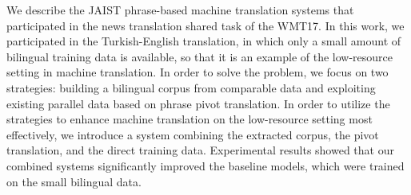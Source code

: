 We describe the JAIST phrase-based machine translation systems that participated in the news translation shared task of the WMT17. In this work, we participated in the Turkish-English translation, in which only a small amount of bilingual training data is available, so that it is an example of the low-resource setting in machine translation. In order to solve the problem, we focus on two strategies: building a bilingual corpus from comparable data and exploiting existing parallel data based on phrase pivot translation. In order to utilize the strategies to enhance machine translation on the low-resource setting most effectively, we introduce a system combining the extracted corpus, the pivot translation, and the direct training data. Experimental results showed that our combined systems significantly improved the baseline models, which were trained on the small bilingual data.
